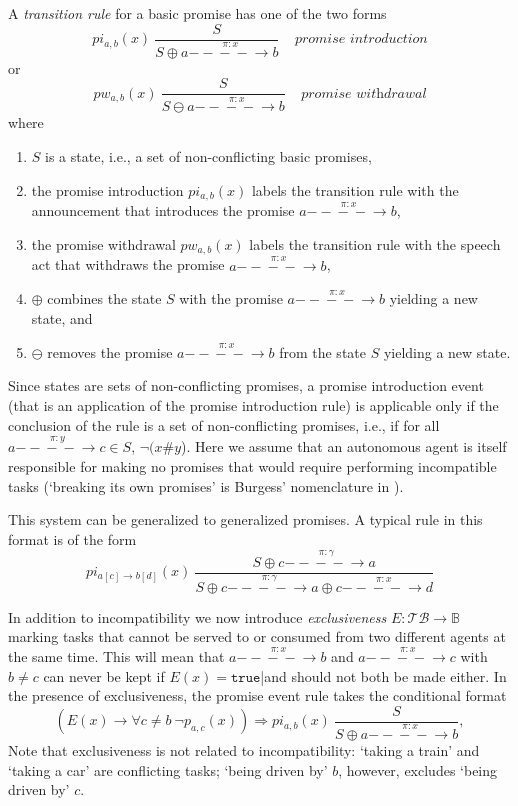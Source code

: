 \documentclass{pseudoelsart}
\newcommand{\tr}{{\mathtt{true}}}
\newcommand{\prom}[3]{#1 \overset{\pi:#2}{- \!\!\!- \!\!\!- \!\!\!- \!\!\!\!\!\!\!\!\longrightarrow} #3}
\newcommand{\lprom}[3]{pi_{#1,#2}(#3)}
\newcommand{\lwprom}[3]{pw_{#1,#2}(#3)}
\begin{document}
A \emph{transition rule} for a basic promise has one of the two forms
\[
pi_{a, b}(x)\ \frac{S}{S\oplus \prom{a}{x}{b}}\ \ \ \ \ \textit{promise introduction}
\]
or
\[
pw_{a, b}(x)\ \frac{S}{S\ominus \prom{a}{x}{b}}\ \ \ \ \ \textit{promise withdrawal}
\]
where
\begin{enumerate}
\item $S$ is a state, i.e., a set of non-conflicting basic promises,
\item the promise introduction $\lprom{a}{b}{x}$ labels the transition rule with
the announcement that introduces the promise
$\prom{a}{x}{b}$, 
\item the promise withdrawal $\lwprom{a}{b}{x}$ labels the transition rule with the speech act that withdraws the promise
$\prom{a}{x}{b}$, 
\item $\oplus$ combines the state $S$ with the promise $\prom{a}{x}{b}$ yielding a new state, and
\item $\ominus$ removes the promise $\prom{a}{x}{b}$ from the state $S$ yielding a new state.
\end{enumerate}
Since states are sets of non-conflicting promises, a promise introduction event (that is an application of the promise introduction rule) is applicable only if the conclusion of the rule is a set of non-conflicting
promises, i.e., if for all $\prom{a}{y}{c}\in S$, $\neg (x\#y$).
Here we assume that an autonomous agent is itself responsible
for making no promises that would require performing incompatible
tasks (`breaking its own promises' is Burgess' nomenclature in \cite{B06}).

This system can be generalized to generalized promises. A typical rule in this format is of the form
\[
pi_{a[c]\rightarrow b[d]}(x)\ \frac{S\oplus \prom{c}{\gamma}{a}}{S\oplus \prom{c}{\gamma}{a}\oplus \prom{c}{x}{d}}
\]

In addition to incompatibility we now introduce \emph{exclusiveness} $E: \mathcal{TB} \rightarrow \mathbb{B}$
marking tasks that cannot be served to or consumed from two different agents at the same time. This will mean that
$\prom{a}{x}{b}$ and $\prom{a}{x}{c}$ with $b\neq c$ can never be kept if $E(x)=\tr$|and should not 
both be made either. In the presence of exclusiveness, the promise event rule takes the conditional format
\[
(E(x) \rightarrow \forall c\neq b\ \neg p_{a,c}(x)) \Longrightarrow pi_{a, b}(x)\ \frac{S}{S\oplus \prom{a}{x}{b}},
\]
Note that exclusiveness is not related to incompatibility: `taking a train' and 
`taking a car'
are conflicting tasks; `being driven by' $b$, however, excludes `being driven by' $c$.
\end{document}
